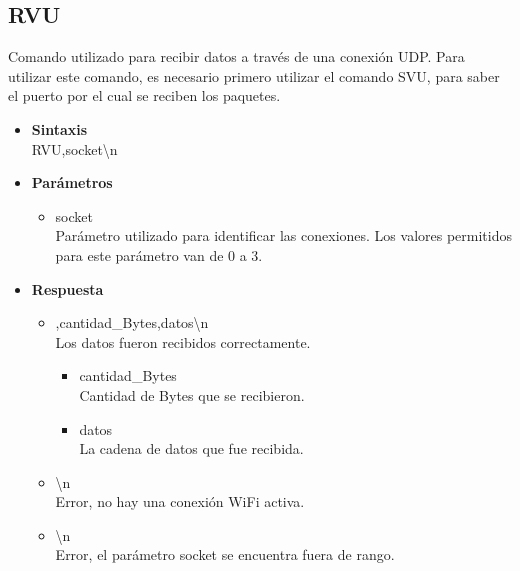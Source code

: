 \documentclass[a4paper,spanish]{article}
\begin{document}
\subsection{RVU}
Comando utilizado para recibir datos a través de una conexión UDP. Para utilizar este comando, es necesario primero utilizar el comando SVU, para saber el puerto por el cual se reciben los paquetes. 
\begin{itemize}
	\item \textbf{Sintaxis}\\
	{\ttfamily RVU,socket\textbackslash n}
	\item \textbf{Parámetros}
	\begin{itemize}
		\item{\ttfamily socket}\\
		Parámetro utilizado para identificar las conexiones. Los valores permitidos para este parámetro van de 0 a 3.
	\end{itemize}
	\item \textbf{Respuesta}
	\begin{itemize}
		\item{,cantidad\_Bytes,datos\textbackslash n} \\
		Los datos fueron recibidos correctamente.
		\begin{itemize}
			\item {\ttfamily cantidad\_Bytes}\\
			Cantidad de Bytes que se recibieron. 
			\item {\ttfamily datos}\\
			La cadena de datos que fue recibida.
		\end{itemize}
		\item{\textbackslash n} \\
		Error, no hay una conexión WiFi activa.
		\item{\textbackslash n} \\
		Error, el parámetro {\ttfamily socket} se encuentra fuera de rango.
	\end{itemize}
\end{itemize}
\end{document}
